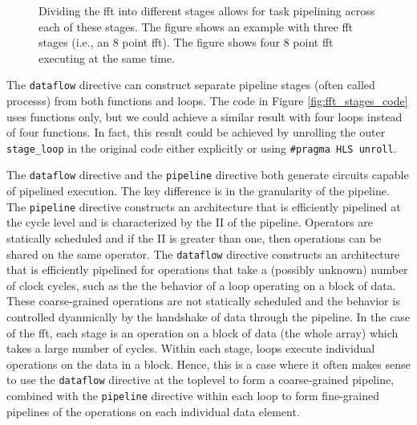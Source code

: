 \begin{figure}
\centering
{\scriptsize }

\caption{ Dividing the \gls{fft} into different stages allows for task pipelining across each of these stages. The figure shows an example with three \gls{fft} stages (i.e., an 8 point \gls{fft}). The figure shows four 8 point \gls{fft} executing at the same time. }
\label{fig:fftstages}
\end{figure}

The \lstinline|dataflow| directive can construct separate pipeline stages (often called \glspl{process}) from both functions and loops. The code in Figure \ref{fig:fft_stages_code} uses functions only, but we could achieve a similar result with four loops instead of four functions.  In fact, this result could be achieved by unrolling the outer \lstinline|stage_loop| in the original code either explicitly or using \lstinline|#pragma HLS unroll|.

The \lstinline{dataflow} directive and the \lstinline{pipeline} directive both generate circuits capable of pipelined execution.  The key difference is in the granularity of the pipeline. The \lstinline{pipeline} directive constructs an architecture that is efficiently pipelined at the cycle level and is characterized by the II of the pipeline.  Operators are statically scheduled and if the II is greater than one, then operations can be shared on the same operator.  The \lstinline{dataflow} directive constructs an architecture that is efficiently pipelined for operations that take a (possibly unknown) number of clock cycles, such as the the behavior of a loop operating on a block of data.  These coarse-grained operations are not statically scheduled and the behavior is controlled dyanmically by the handshake of data through the pipeline.  In the case of the \gls{fft}, each stage is an operation on a block of data (the whole array) which takes a large number of cycles.  Within each stage, loops execute individual operations on the data in a block.  Hence, this is a case where it often makes sense to use the \lstinline|dataflow| directive at the toplevel to form a coarse-grained pipeline, combined with the \lstinline|pipeline| directive within each loop to form fine-grained pipelines of the operations on each individual data element.

